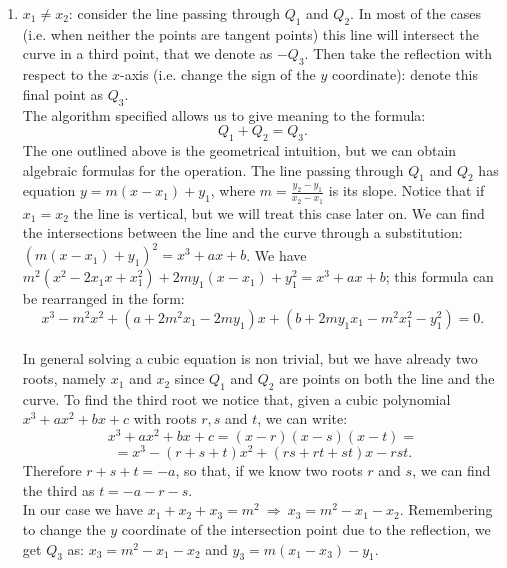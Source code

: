 \begin{enumerate}
	\item $x_1 \neq x_2$: consider the line passing through $Q_1$ and $Q_2$. In most of the cases (i.e. when neither the points are tangent points) this line will intersect the curve in a third point, that we denote as $-Q_3$. Then take the reflection with respect to the $x$-axis (i.e. change the sign of the $y$ coordinate): denote this final point as $Q_3$.
	\\
	The algorithm specified allows us to give meaning to the formula: 
	$$Q_1 + Q_2 = Q_3.$$
	The one outlined above is the geometrical intuition, but we can obtain algebraic formulas for the operation. The line passing through $Q_1$ and $Q_2$ has equation $y = m(x - x_1) + y_1$, where $m = \frac{y_2 - y_1}{x_2 - x_1}$ is its slope. Notice that if $x_1 = x_2$ the line is vertical, but we will treat this case later on. We can find the intersections between the line and the curve through a substitution: $(m(x - x_1) + y_1)^2 = x^3 + ax + b$. We have $m^2(x^2 - 2x_1x + x_1^2) + 2my_1(x - x_1) + y_1^2 = x^3 + ax + b$; this formula can be rearranged in the form: $$x^3 - m^2x^2 + (a + 2m^2x_1 - 2my_1)x + (b + 2my_1x_1 - m^2x_1^2 -y_1^2) = 0.$$
	\\
	In general solving a cubic equation is non trivial, but we have already two roots, namely $x_1$ and $x_2$ since $Q_1$ and $Q_2$ are points on both the line and the curve. To find the third root we notice that, given a cubic polynomial $x^3 + ax^2 + bx + c$ with roots $r, s$ and $t$, we can write: $$x^3 + ax^2 + bx + c = (x - r)(x - s)(x - t) =$$ 
	$$= x^3 - (r + s + t)x^2 + (rs + rt + st)x - rst.$$
	Therefore $r + s + t = - a$, so that, if we know two roots $r$ and $s$, we can find the third as $t = - a - r - s$.
	\\
	In our case we have $x_1 + x_2 + x_3 = m^2 \ \Longrightarrow \ x_3 = m^2 - x_1 - x_2$. Remembering to change the $y$ coordinate of the intersection point due to the reflection, we get $Q_3$ as: $x_3 = m^2 - x_1 - x_2$ and $y_3 = m(x_1 - x_3) - y_1$.
	\begin{figure}
		\noindent
		\label{fig:figure3}
	\end{figure}
	

\end{enumerate}

